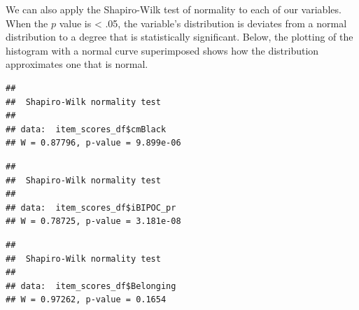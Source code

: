 \documentclass[
  11pt,
]{book}
\newenvironment{Shaded}{\begin{snugshade}}{\end{snugshade}}
\newcommand{\CommentTok}[1]{\textcolor[rgb]{0.37,0.37,0.37}{\textit{#1}}}
\newcommand{\FunctionTok}[1]{\textcolor[rgb]{0.27,0.27,0.27}{\textbf{#1}}}
\newcommand{\NormalTok}[1]{#1}
\newcommand{\SpecialCharTok}[1]{\textcolor[rgb]{0.43,0.43,0.43}{\textbf{#1}}}
\begin{document}
We can also apply the Shapiro-Wilk test of normality to each of our variables. When the \(p\) value is \textless{} .05, the variable's distribution is deviates from a normal distribution to a degree that is statistically significant. Below, the plotting of the histogram with a normal curve superimposed shows how the distribution approximates one that is normal.

\begin{Shaded}
\end{Shaded}

\begin{verbatim}
## 
##  Shapiro-Wilk normality test
## 
## data:  item_scores_df$cmBlack
## W = 0.87796, p-value = 9.899e-06
\end{verbatim}

\begin{Shaded}
\end{Shaded}

\begin{verbatim}
## 
##  Shapiro-Wilk normality test
## 
## data:  item_scores_df$iBIPOC_pr
## W = 0.78725, p-value = 3.181e-08
\end{verbatim}

\begin{Shaded}
\end{Shaded}

\begin{verbatim}
## 
##  Shapiro-Wilk normality test
## 
## data:  item_scores_df$Belonging
## W = 0.97262, p-value = 0.1654
\end{verbatim}

\begin{Shaded}
\end{Shaded}
\end{document}
